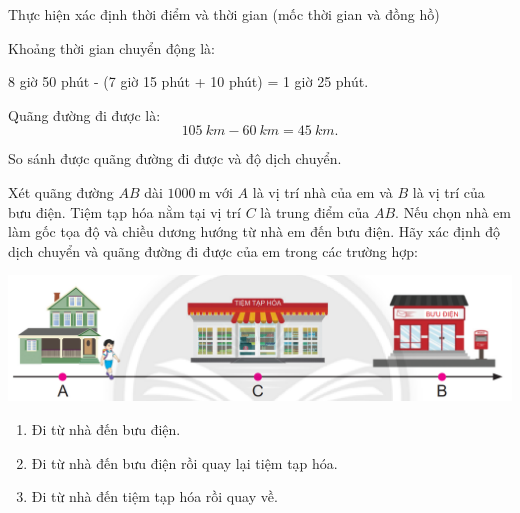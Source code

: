 \begin{dang}{Thực hiện xác định thời điểm và thời gian (mốc thời gian và đồng hồ)}
{{\begin{enumerate}[label=\alph*)]
			Khoảng thời gian chuyển động là:
			\begin{center}
				8 giờ 50 phút - (7 giờ 15 phút + 10 phút) = 1 giờ 25 phút.
			\end{center}
			Quãng đường đi được là:
			$$\SI{105}{km}-\SI{60}{km}=\SI{45}{km}.$$
		\end{enumerate}
	}}
\end{dang}

\begin{dang}{So sánh được quãng đường đi được và độ dịch chuyển.}
{Xét quãng đường $AB$ dài $\SI{1000}{\meter}$ với $A$ là vị trí nhà của em và $B$ là vị trí của bưu điện. Tiệm tạp hóa nằm tại vị trí $C$ là trung điểm của $AB$. Nếu chọn nhà em làm gốc tọa độ và chiều dương hướng từ nhà em đến bưu điện. Hãy xác định độ dịch chuyển và quãng đường đi được của em trong các trường hợp:
	\begin{center}
		\includegraphics[width=0.6\linewidth]{../figs/VN10-2023-PH-TP004-2}
	\end{center}
	\begin{enumerate}[label=\alph*)]
		\item Đi từ nhà đến bưu điện.
		\item Đi từ nhà đến bưu điện rồi quay lại tiệm tạp hóa.
		\item Đi từ nhà đến tiệm tạp hóa rồi quay về. 
	\end{enumerate}	
}
{}


\end{dang}
